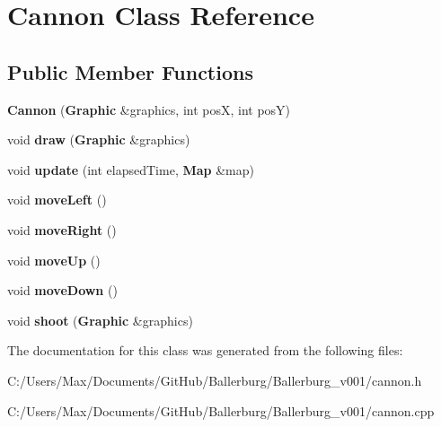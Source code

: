 \section{Cannon Class Reference}
\label{class_cannon}
\subsection*{Public Member Functions}
\begin{DoxyCompactItemize}
\item 
{\bfseries Cannon} ({\bf Graphic} \&graphics, int pos\+X, int pos\+Y)\label{class_cannon_a7dc46cea020d9360ce939f5eed18604f}

\item 
void {\bfseries draw} ({\bf Graphic} \&graphics)\label{class_cannon_adc9351fb66c450f50e1ebb71a17ab101}

\item 
void {\bfseries update} (int elapsed\+Time, {\bf Map} \&map)\label{class_cannon_ace63d1bb033c544019f570fcc6d34751}

\item 
void {\bfseries move\+Left} ()\label{class_cannon_a52cda8f88ae6a3bd6220dcaf7f35e275}

\item 
void {\bfseries move\+Right} ()\label{class_cannon_af6c1e5ba6193fd4e4e9c74c8306fa01d}

\item 
void {\bfseries move\+Up} ()\label{class_cannon_a794ccd790953d7a565489a679427a98a}

\item 
void {\bfseries move\+Down} ()\label{class_cannon_aaaab504200dc7755b4a1088646f8c8d6}

\item 
void {\bfseries shoot} ({\bf Graphic} \&graphics)\label{class_cannon_acd07d0e39e049745e8d146a7be1ccf33}

\end{DoxyCompactItemize}


The documentation for this class was generated from the following files\+:\begin{DoxyCompactItemize}
\item 
C\+:/\+Users/\+Max/\+Documents/\+Git\+Hub/\+Ballerburg/\+Ballerburg\+\_\+v001/cannon.\+h\item 
C\+:/\+Users/\+Max/\+Documents/\+Git\+Hub/\+Ballerburg/\+Ballerburg\+\_\+v001/cannon.\+cpp\end{DoxyCompactItemize}
